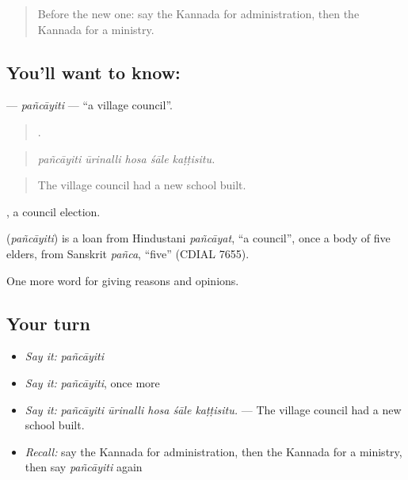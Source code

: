 \label{lesson:KA-C395-pancayiti}



\begin{quote}
Before the new one: say the Kannada for administration, then the Kannada for a ministry.
\end{quote}

\subsection*{You'll want to know: }
\textbf{} — \emph{pañcāyiti} — \textquotedblleft{}a village council\textquotedblright{}.

\begin{quote}
    .
\end{quote}

\begin{quote}
\emph{pañcāyiti ūrinalli hosa śāle kaṭṭisitu.}
\end{quote}

\begin{quote}
The village council had a new school built.
\end{quote}

 , a council election.

\begin{cousinweb}
\textbf{} (\emph{pañcāyiti}) is a loan from Hindustani \emph{pañcāyat}, \textquotedblleft{}a council\textquotedblright{}, once a body of five elders, from Sanskrit \emph{pañca}, \textquotedblleft{}five\textquotedblright{} (CDIAL 7655).
\end{cousinweb}

\begin{grammarlens}[title={What you've built}]
One more word for giving reasons and opinions.
\end{grammarlens}

\subsection*{Your turn}
\begin{itemize}
\raggedright
  \item \emph{Say it:} \emph{pañcāyiti}
  \item \emph{Say it:} \emph{pañcāyiti}, once more
  \item \emph{Say it:} \emph{pañcāyiti ūrinalli hosa śāle kaṭṭisitu.} — The village council had a new school built.
  \item \emph{Recall:} say the Kannada for administration, then the Kannada for a ministry, then say \emph{pañcāyiti} again
\end{itemize}

